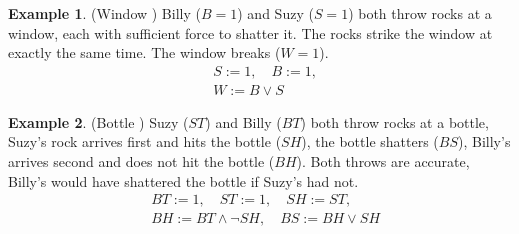 \documentclass[11pt,a4paper]{book}
\theoremstyle{definition}
\theoremstyle{definition}
\newtheorem{example}{Example}[section]
\theoremstyle{definition}
\theoremstyle{remark}
\begin{document}
\begin{example}(Window \cite{Weslake2015partialtheory})
Billy ($B=1$) and Suzy ($S=1$) both throw rocks at a window, each with sufficient force to shatter it. The rocks strike the window at exactly the same time. The window breaks ($W=1$).
\begin{equation*}
\begin{split}
&S:=1 , \quad B:=1, \\
& W:= B \lor S
\end{split}
\end{equation*}
\begin{center}
\end{center}
\end{example}


\begin{example}(Bottle \cite{Weslake2015partialtheory})
Suzy ($ST$) and Billy ($BT$) both throw rocks at a bottle, Suzy’s rock arrives first and hits the bottle ($SH$), the bottle shatters ($BS$), Billy’s arrives second and does not hit the bottle ($BH$). 
Both throws are accurate, Billy’s would have shattered the bottle if Suzy’s had not.
\begin{equation*}
\begin{split}
&BT:=1, \quad ST:= 1, \quad SH:=ST, \\
&BH:= BT \land \neg SH, \quad BS:= BH \lor SH
\end{split}
\end{equation*}
\begin{center}
\end{center}
\end{example}
\end{document}
